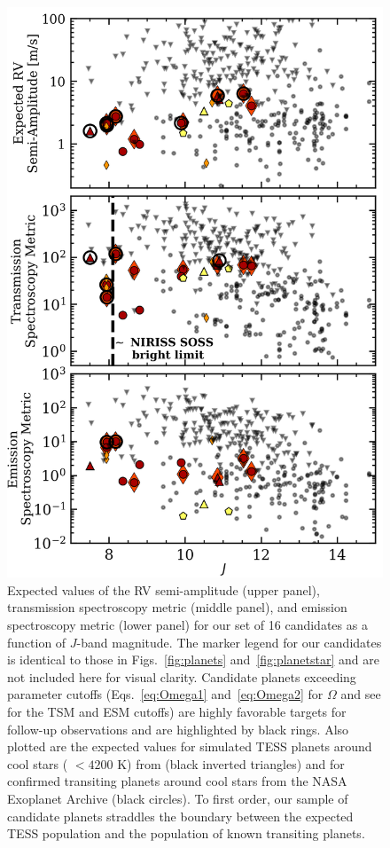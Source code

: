 

\begin{figure}
  \centering
  \includegraphics[width=0.6\hsize]{figures/planetsample_followup.png}
  \caption[Follow-up diagnostics for the \texttt{ORION} planet candidate sample.]
      {Expected values of the RV semi-amplitude (upper panel), transmission spectroscopy metric (middle panel),
    and emission spectroscopy metric (lower panel) for our set of 16 candidates as a function of $J$-band
    magnitude. The marker legend for our candidates is identical to those in Figs.~\ref{fig:planets}
    and~\ref{fig:planetstar} and are not included here for visual clarity. Candidate planets
    exceeding parameter cutoffs (Eqs.~\ref{eq:Omega1} and~\ref{eq:Omega2} for $\Omega$ and see \citealt{kempton18} for
    the TSM and ESM cutoffs) are highly favorable targets for follow-up observations and are highlighted by black rings.
    Also plotted are the expected values for simulated TESS planets around cool stars (\teff{} $< 4200$ K) from
    \cite{barclay18} (black inverted triangles) and for confirmed transiting planets around cool stars from the NASA
    Exoplanet Archive (black circles). To first order, our sample of candidate planets straddles the boundary
    between the expected TESS population and the population of known transiting planets.}
  \label{fig:followup}
\end{figure}

